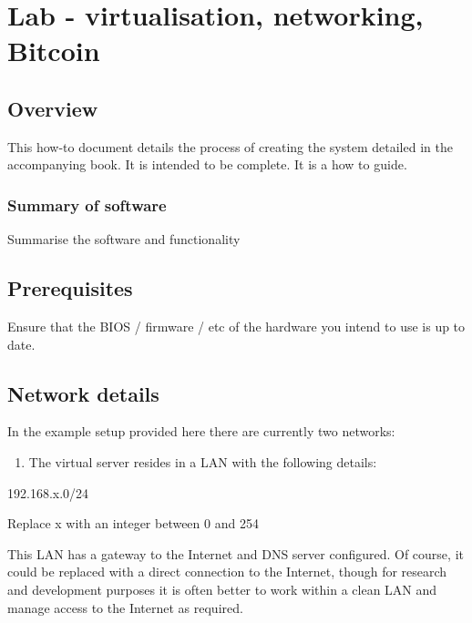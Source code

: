 \hypertarget{lab---virtualisation-networking-bitcoin}{%
\section{Lab - virtualisation, networking,
Bitcoin}\label{lab---virtualisation-networking-bitcoin}}

\hypertarget{overview}{%
\subsection{Overview}\label{overview}}

This how-to document details the process of creating the system detailed
in the accompanying book. It is intended to be complete. It is a how to
guide.

\hypertarget{summary-of-software}{%
\subsubsection{Summary of software}\label{summary-of-software}}

Summarise the software and functionality

\hypertarget{prerequisites}{%
\subsection{Prerequisites}\label{prerequisites}}

Ensure that the BIOS / firmware / etc of the hardware you intend to use
is up to date.

\hypertarget{network-details}{%
\subsection{Network details}\label{network-details}}

In the example setup provided here there are currently two networks:

\begin{enumerate}
\def\labelenumi{\arabic{enumi}.}
\tightlist
\item
  The virtual server resides in a LAN with the following details:
\end{enumerate}

192.168.x.0/24

Replace x with an integer between 0 and 254

This LAN has a gateway to the Internet and DNS server configured. Of
course, it could be replaced with a direct connection to the Internet,
though for research and development purposes it is often better to work
within a clean LAN and manage access to the Internet as required.

